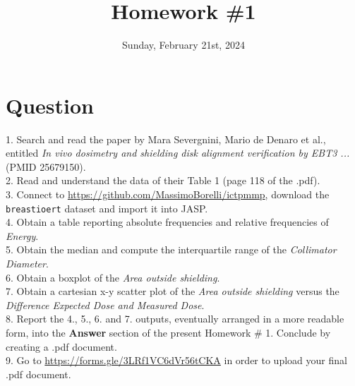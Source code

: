 \documentclass[
	12pt, %
]{fphw}
\title{Homework \#1} %
\author{ } %
\date{Sunday, February 21st, 2024} %
\institute{The \textit{Abdus Salam} International Centre for Theoretical Physics \\ Master of Advanced Studies in Medical Physics} %
\begin{document}
\maketitle %

\section*{Question}

\begin{problem}

1. Search and read the paper by Mara Severgnini, Mario de Denaro et al., entitled \textit{In vivo dosimetry and shielding disk alignment verification by EBT3 ...} (PMID 25679150). \\
 
2. Read and understand the data of their Table 1 (page 118 of the .pdf).\\

3. Connect to \url{https://github.com/MassimoBorelli/ictpmmp}, download the \texttt{breastioert} dataset and import it into \textsf{JASP}.\\

4. Obtain a table reporting absolute frequencies and relative frequencies of \textit{Energy}.\\

5. Obtain the median and compute the interquartile range of the \textit{Collimator Diameter}. \\

6. Obtain a boxplot of the \textit{Area outside shielding}.\\

7. Obtain a cartesian x-y scatter plot of the \textit{Area outside shielding} versus the  \textit{Difference Expected Dose and Measured Dose}. \\

8. Report the 4., 5., 6. and 7. outputs, eventually arranged in a more readable form, into the \textbf{Answer} section of the present Homework \# 1. Conclude by creating a .pdf document.\\

9. Go to \url{https://forms.gle/3LRf1VC6dVr56tCKA} in order to upload your final .pdf document.


\end{problem}
\end{document}
